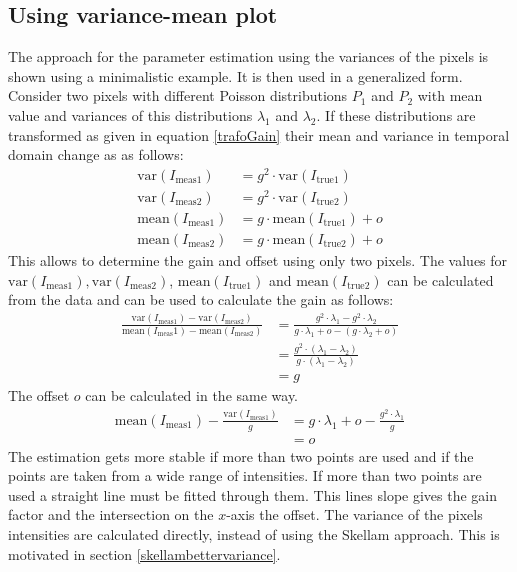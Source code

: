 \subsection{Using variance-mean plot} \label{skellam1}
The approach for the parameter estimation using the variances of the pixels is shown using a minimalistic example. It is then used in a generalized form.\newline
Consider two pixels with different Poisson distributions $P_1$ and $P_2$ with mean value and variances of this distributions $\lambda_1$ and $\lambda_2$. If these distributions are transformed as given in equation \ref{trafoGain} their mean and variance in temporal domain change as as follows:
\begin{align}
	\text{var}(I_{\text{meas}1})& = g^2\cdot\text{var}(I_{\text{true}1}) \label{calcvar}\\ 
	\text{var}(I_{\text{meas}2})& = g^2\cdot\text{var}(I_{\text{true}2})\\
	\text{mean}(I_{\text{meas}1})& = g\cdot \text{mean}(I_{\text{true}1}) + o\\
	\text{mean}(I_{\text{meas}2})& = g\cdot \text{mean}(I_{\text{true}2}) + o
\end{align}
This allows to determine the gain and offset using only two pixels.
The values for $\text{var}(I_{\text{meas}1}), \text{var}(I_{\text{meas}2})$, $\text{mean}(I_{\text{true}1})$ and $\text{mean}(I_{\text{true}2})$ can be calculated from the data and can be used to calculate the gain as follows:
\begin{align}
	\frac{\text{var}(I_{\text{meas}1})-\text{var}(I_{\text{meas}2})}{\text{mean}({I_\text{meas}1})-\text{mean}(I_{\text{meas}2})}&= \frac{g^2\cdot \lambda_1  - g^2\cdot \lambda_2 }{g\cdot \lambda_1 + o - (g\cdot \lambda_2+o)}\\
	& = \frac{g^2\cdot(\lambda_1-\lambda_2)}{g\cdot (\lambda_1-\lambda_2)}\\
	& = g
\end{align}
The offset $o$ can be calculated in the same way.
\begin{align}
	\text{mean}(I_{\text{meas}1}) - \frac{\text{var}(I_{\text{meas}1})}{g} &= g\cdot \lambda_1 + o - \frac{g^2\cdot\lambda_1}{g}\\
	&= o
\end{align}
The estimation gets more stable if more than two points are used and if the points are taken from a wide range of intensities. If more than two points are used a straight line must be fitted through them. This lines slope gives the gain factor and the intersection on the $x$-axis the offset. The variance of the pixels intensities are calculated directly, instead of using the Skellam approach. This is motivated in section \ref{skellambettervariance}.
